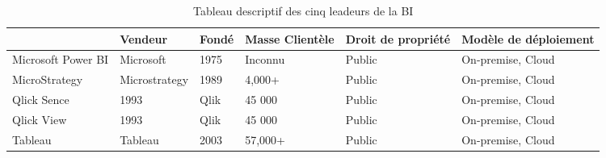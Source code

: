 \begin{table}[ht]
	\centering
	\caption{Tableau descriptif des cinq leadeurs de la BI }
	\footnotesize
	\begin{tabularx}{\textwidth}{|p{1.8cm}|X|X|X|X|X|}
          \hline
          & 
          {\textbf{Vendeur}}
          &
          {\textbf{Fondé}}
          &
          {\textbf{Masse Clientèle}}
          &
          {\textbf{Droit de propriété}}
          &
          {\textbf{Modèle de déploiement}}
          \\
          \hline
          Microsoft Power BI
          &
          Microsoft
          &
          1975
          &
          Inconnu
          &
          Public
          &
          On-premise, Cloud
          \\
          \hline
          MicroStrategy
          &
          Microstrategy
          &
          1989
          &
          4,000+
          &
          Public
          &
          On-premise, Cloud
          \\
          \hline
          Qlick Sence
          &
          1993
          &
          Qlik
          &
          45 000
          &
          Public
          &
          On-premise, Cloud
          \\
          \hline
          Qlick View
          &
          1993
          &
          Qlik
          &
          45 000
          &
          Public
          &
          On-premise, Cloud
          \\
          \hline
          Tableau
          &
          Tableau
          &
          2003
          &
          57,000+
          &
          Public
          &
          On-premise, Cloud
          \\
          \hline
        \end{tabularx}
	\label{tab:exple}
\end{table}
\FloatBarrier

